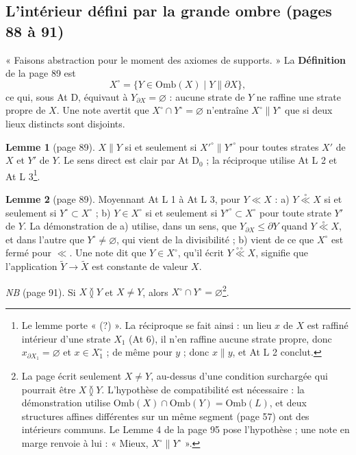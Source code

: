 \documentclass[11pt,a4paper]{article}
\begin{document}
\subsection*{L'intérieur défini par la grande ombre (pages 88 à 91)}

« Faisons abstraction pour le moment des axiomes de supports. » La
\textbf{Définition} de la page 89 est
\[
X^{\circ} = \{Y \in \mathrm{Omb}(X) \mid Y \parallel \partial X\} ,
\]
ce qui, sous At D, équivaut à $Y_{\partial X} = \varnothing$ : aucune strate de $Y$
ne raffine une strate propre de $X$. Une note avertit que $X^{\circ} \cap Y^{\circ}
= \varnothing$ n'entraîne $X^{\circ} \parallel Y^{\circ}$ que si deux lieux
distincts sont disjoints.

\textbf{Lemme 1} (page 89). $X \parallel Y$ si et seulement si $X'^{\circ}
\parallel Y'^{\circ}$ pour toutes strates $X'$ de $X$ et $Y'$ de $Y$. Le sens
direct est clair par At D$_{0}$ ; la réciproque utilise At L 2 et At L 3\footnote{Le
lemme porte « (?) ». La réciproque se fait ainsi : un lieu $x$ de $X$ est raffiné
intérieur d'une strate $X_{1}$ (At 6), il n'en raffine aucune strate propre, donc
$x_{\partial X_{1}} = \varnothing$ et $x \in X_{1}^{\circ}$ ; de même pour $y$ ; donc
$x \parallel y$, et At L 2 conclut.}.

\textbf{Lemme 2} (page 89). Moyennant At L 1 à At L 3, pour $Y \ll X$ : a) $Y
\mathrel{\overset{\circ}{\ll}} X$ si et seulement si $Y^{\circ} \subset X^{\circ}$ ;
b) $Y \in X^{\circ}$ si et seulement si $Y'^{\circ} \subset X^{\circ}$ pour toute
strate $Y'$ de $Y$. La démonstration de a) utilise, dans un sens, que
$Y_{\partial X} \leq \partial Y$ quand $Y \mathrel{\overset{\circ}{\ll}} X$, et dans
l'autre que $Y^{\circ} \neq \varnothing$, qui vient de la divisibilité ; b) vient de
ce que $X^{\circ}$ est fermé pour $\ll$. Une note dit que $Y \in X^{\circ}$, qu'il
écrit $Y \overset{\circ\circ}{\ll} X$, signifie que l'application $\widetilde{Y} \to
\widetilde{X}$ est constante de valeur $X$.

\emph{NB} (page 91). Si $X \between Y$ et $X \neq Y$, alors $X^{\circ} \cap
Y^{\circ} = \varnothing$\footnote{La page écrit seulement $X \neq Y$, au-dessus
d'une condition surchargée qui pourrait être $X \between Y$. L'hypothèse de
compatibilité est nécessaire : la démonstration utilise $\mathrm{Omb}(X) \cap
\mathrm{Omb}(Y) = \mathrm{Omb}(L)$, et deux structures affines différentes sur un
même segment (page 57) ont des intérieurs communs. Le Lemme 4 de la page 95 pose
l'hypothèse ; une note en marge renvoie à lui : « Mieux, $X^{\circ} \parallel
Y^{\circ}$ ».}.
\end{document}
